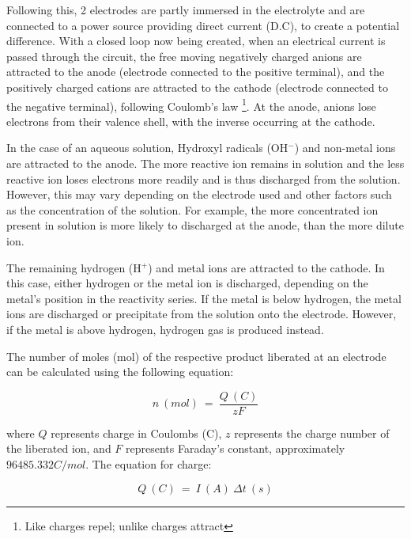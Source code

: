 \documentclass[11pt, a4]{article}
\begin{document}
			\bigbreak
			
			Following this, 2 electrodes are partly immersed in the electrolyte and are connected to a power source providing direct current (D.C), to create a potential difference. With a closed loop now being created, when an electrical current is passed through the circuit, the free moving negatively charged anions are attracted to the anode (electrode connected to the positive terminal), and the positively charged cations are attracted to the cathode (electrode connected to the negative terminal), following Coulomb's law \footnote{Like charges repel; unlike charges attract}. At the anode, anions lose electrons from their valence shell, with the inverse occurring at the cathode.
			
			\bigbreak
			
			In the case of an aqueous solution, Hydroxyl radicals (OH$^{-}$) and non-metal ions are attracted to the anode. The more reactive ion remains in solution and the less reactive ion loses electrons more readily and is thus discharged from the solution. However, this may vary depending on the electrode used and other factors such as the concentration of the solution. For example, the more concentrated ion present in solution is more likely to discharged at the anode, than the more dilute ion. 
			
			\bigbreak
			
			The remaining hydrogen (H$^{+}$) and metal ions are attracted to the cathode. In this case, either hydrogen or the metal ion is discharged, depending on the metal's position in the reactivity series. If the metal is below hydrogen, the metal ions are discharged or precipitate from the solution onto the electrode. However, if the metal is above hydrogen, hydrogen gas is produced instead.
			
			\bigbreak
			
			The number of moles (mol) of the respective product liberated at an electrode can be calculated using the following equation:
			
			\begin{equation}
				n \ (mol) \ = \ \frac{Q \ (C)}{zF}
			\end{equation}
			
			where $Q$ represents charge in Coulombs (C), $z$ represents the charge number of the liberated ion, and $F$ represents Faraday's constant, approximately $96485.332 C/mol$. The equation for charge:
			
			\begin{equation}
				Q \ (C) \ = \ I \ (A) \ \Delta t \ (s)
			\end{equation}
			
\end{document}
